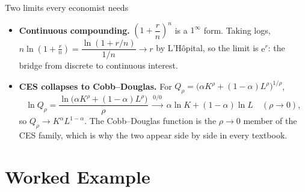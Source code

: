\begin{rulebox}{Two limits every economist needs}
\begin{itemize}[leftmargin=1.6em,itemsep=0.4ex]
  \item \textbf{Continuous compounding.} $\left(1+\dfrac{r}{n}\right)^{n}$
        is a $1^{\infty}$ form. Taking logs,
        $n\ln\!\left(1+\frac{r}{n}\right)
        =\dfrac{\ln(1+r/n)}{1/n}\to r$ by L'H\^opital, so the limit is
        $\mathrm{e}^{r}$: the bridge from discrete to continuous interest.
  \item \textbf{CES collapses to Cobb--Douglas.} For
        $Q_{\rho}=\bigl(\alpha K^{\rho}+(1-\alpha)L^{\rho}\bigr)^{1/\rho}$,
        \[
          \ln Q_{\rho}
          =\frac{\ln\bigl(\alpha K^{\rho}+(1-\alpha)L^{\rho}\bigr)}{\rho}
          \;\overset{0/0}{\longrightarrow}\;
          \alpha\ln K+(1-\alpha)\ln L \quad (\rho\to0),
        \]
        so $Q_{\rho}\to K^{\alpha}L^{1-\alpha}$. The Cobb--Douglas function
        is the $\rho\to0$ member of the CES family, which is why the two
        appear side by side in every textbook.
\end{itemize}
\end{rulebox}

\section{Worked Example}

